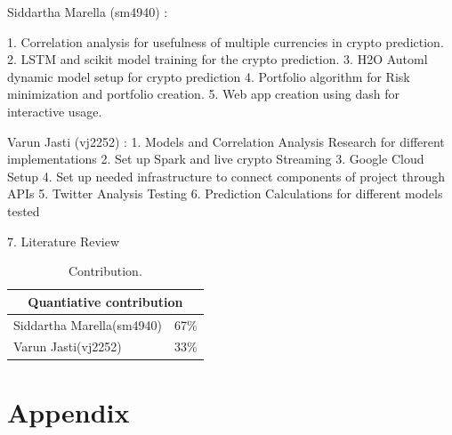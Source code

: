 \documentclass[final]{cvpr}
\begin{document}
Siddartha Marella (sm4940) : 

1. Correlation analysis for usefulness of multiple currencies in crypto prediction.
2. LSTM and scikit model training for the crypto prediction.
3. H2O Automl dynamic model setup for crypto prediction
4. Portfolio algorithm for Risk minimization and portfolio creation.
5. Web app creation using dash for interactive usage.

Varun Jasti (vj2252) :  1. Models and Correlation Analysis Research for                                different implementations 
                        2. Set up Spark and live crypto Streaming
                        3. Google Cloud Setup 
                        4. Set up needed infrastructure to connect components of project through APIs 
                        5. Twitter Analysis Testing 
                        6. Prediction Calculations for different models        tested
                        
                        7. Literature Review 
\begin{table}[h!]
\centering
 \begin{tabular}{ |p{2.5cm}|p{1.5cm}|}
 \hline
 \multicolumn{2}{|c|}{\textbf{Quantiative contribution}} \\
 \hline
 Siddartha Marella(sm4940) & 67\%  \\
 \hline
 Varun Jasti(vj2252) & 33\%\\
 \hline
 \end{tabular}
  \caption{Contribution.}
 \label{tab:ADF-C}
\end{table}


\section{Appendix}
\end{document}
